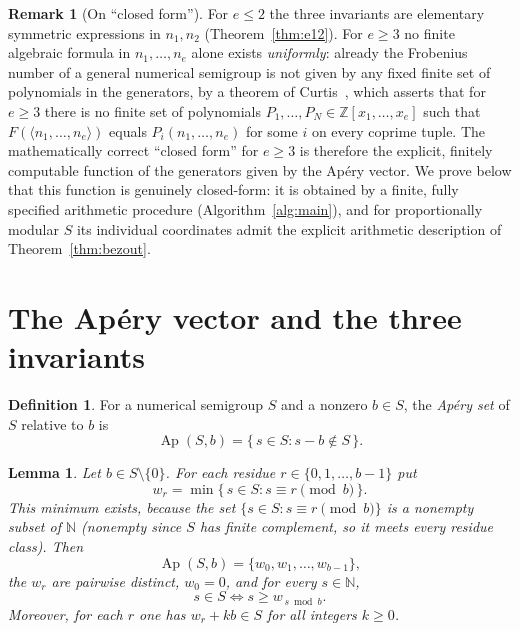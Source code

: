 \documentclass{amsart}
\newtheorem{lemma}{Lemma}
\theoremstyle{definition}
\newtheorem{definition}{Definition}
\newtheorem{remark}{Remark}
\DeclareMathOperator{\Ap}{Ap}
\newcommand{\NN}{\mathbb{N}}
\newcommand{\ZZ}{\mathbb{Z}}
\begin{document}
\begin{remark}[On ``closed form'']\label{rem:scope}
For $e\le 2$ the three invariants are elementary symmetric expressions in
$n_1,n_2$ (Theorem~\ref{thm:e12}). For $e\ge 3$ no finite algebraic
formula in $n_1,\dots,n_e$ alone exists \emph{uniformly}: already the
Frobenius number of a general numerical semigroup is not given by any fixed
finite set of polynomials in the generators, by a theorem of
Curtis~\cite{Curtis}, which asserts that for $e\ge 3$ there is no finite set
of polynomials $P_1,\dots,P_N\in\ZZ[x_1,\dots,x_e]$ such that
$F(\langle n_1,\dots,n_e\rangle)$ equals $P_i(n_1,\dots,n_e)$ for some $i$
on every coprime tuple. The mathematically correct ``closed form'' for
$e\ge 3$ is therefore the explicit, finitely computable function of the
generators given by the Ap\'ery vector. We prove below that this function is
genuinely closed-form: it is obtained by a finite, fully specified
arithmetic procedure (Algorithm~\ref{alg:main}), and for proportionally
modular $S$ its individual coordinates admit the explicit arithmetic
description of Theorem~\ref{thm:bezout}.
\end{remark}

\section{The Ap\'ery vector and the three invariants}

\begin{definition}\label{def:apery}
For a numerical semigroup $S$ and a nonzero $b\in S$, the \emph{Ap\'ery
set} of $S$ relative to $b$ is
\[
\Ap(S,b)=\{\,s\in S: s-b\notin S\,\}.
\]
\end{definition}

\begin{lemma}\label{lem:aperystructure}
Let $b\in S\setminus\{0\}$. For each residue $r\in\{0,1,\dots,b-1\}$ put
\[
w_r=\min\{\,s\in S: s\equiv r \pmod b\,\}.
\]
This minimum exists, because the set $\{s\in S:s\equiv r\pmod b\}$ is a
nonempty subset of $\NN$ (nonempty since $S$ has finite complement, so it
meets every residue class). Then
\[
\Ap(S,b)=\{w_0,w_1,\dots,w_{b-1}\},
\]
the $w_r$ are pairwise distinct, $w_0=0$, and for every $s\in\NN$,
\begin{equation}\label{eq:Smembership}
s\in S \iff s\ge w_{\,s\bmod b}.
\end{equation}
Moreover, for each $r$ one has $w_r+kb\in S$ for all integers $k\ge0$.
\end{lemma}
\end{document}
